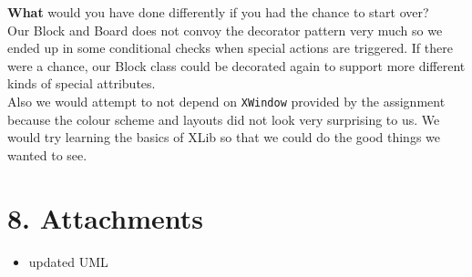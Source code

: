 \documentclass[
]{article}
\providecommand{\tightlist}{%
  \setlength{\itemsep}{0pt}\setlength{\parskip}{0pt}}
\begin{document}
\textbf{What} would you have done differently if you had the chance to
start over?\\
Our Block and Board does not convoy the decorator pattern very much so
we ended up in some conditional checks when special actions are
triggered. If there were a chance, our Block class could be decorated
again to support more different kinds of special attributes.\\
Also we would attempt to not depend on \texttt{XWindow} provided by the
assignment because the colour scheme and layouts did not look very
surprising to us. We would try learning the basics of XLib so that we
could do the good things we wanted to see.

\hypertarget{attachments}{%
\section{8. Attachments}\label{attachments}}

\begin{itemize}
\tightlist
\item
  updated UML
\end{itemize}
\end{document}
